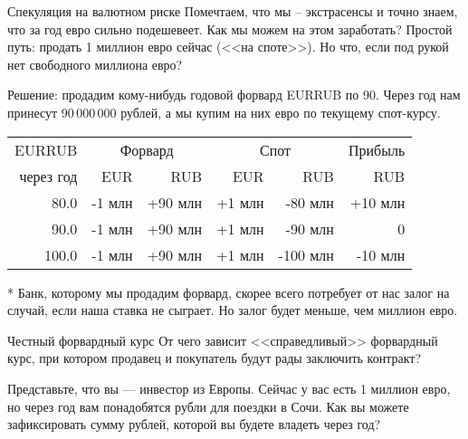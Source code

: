 \documentclass{beamer}
\begin{document}
\begin{frame}{Спекуляция на валютном риске}
\justify
Помечтаем, что мы -- экстрасенсы и точно знаем, что за год евро сильно подешевеет. Как мы можем на этом заработать? Простой путь: продать 1 миллион евро сейчас (<<на споте>>). Но что, если под рукой нет свободного миллиона евро?

\justify
Решение: продадим кому-нибудь годовой форвард EURRUB по 90. Через год нам принесут 90\,000\,000 рублей, а мы купим на них евро по текущему спот-курсу.

\justify
\centering
\begin{tabular}{r|r|r|r|r|r}
EURRUB      & \multicolumn{2}{c|}{Форвард} & \multicolumn{2}{c|}{Спот} & Прибыль \\
\cline{2-5}
через год & EUR     & RUB     & EUR     & RUB      & RUB \\ \hline
80.0      & -1 млн & +90 млн  & +1 млн  & -80 млн  & +10 млн\\
90.0      & -1 млн & +90 млн  & +1 млн  & -90 млн  & 0 \\
100.0     & -1 млн & +90 млн  & +1 млн  & -100 млн & -10 млн \\
\end{tabular}
 
\justify
* Банк, которому мы продадим форвард, скорее всего потребует от нас залог на случай, если наша ставка не сыграет. Но залог будет меньше, чем миллион евро.
\end{frame}



\begin{frame}{Честный форвардный курс}
\justify
От чего зависит <<справедливый>> форвардный курс, при котором продавец и покупатель будут рады заключить контракт? 

\justify
Представьте, что вы --- инвестор из Европы. Сейчас у вас есть 1 миллион евро, но через год вам понадобятся рубли для поездки в Сочи. Как вы можете зафиксировать сумму рублей, которой вы будете владеть через год? 
\end{frame}
\end{document}
